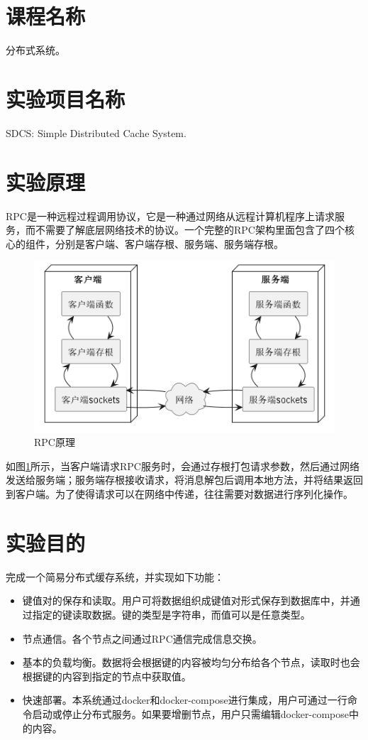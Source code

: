 \section{课程名称}

分布式系统。

\section{实验项目名称}

SDCS: Simple Distributed Cache System.

\section{实验原理}

RPC是一种远程过程调用协议，它是一种通过网络从远程计算机程序上请求服务，而不需要了解底层网络技术的协议。一个完整的RPC架构里面包含了四个核心的组件，分别是客户端、客户端存根、服务端、服务端存根。

\begin{figure}[H]
    \centering
    \includegraphics[width=\textwidth]{examples/rpc原理.png}
    \caption{RPC原理}
    \label{fig:rpc}
\end{figure}

如图\ref{fig:rpc}所示，当客户端请求RPC服务时，会通过存根打包请求参数，然后通过网络发送给服务端；服务端存根接收请求，将消息解包后调用本地方法，并将结果返回到客户端。为了使得请求可以在网络中传递，往往需要对数据进行序列化操作。

\section{实验目的}

完成一个简易分布式缓存系统，并实现如下功能：
\begin{itemize}
    \item 键值对的保存和读取。用户可将数据组织成键值对形式保存到数据库中，并通过指定的键读取数据。键的类型是字符串，而值可以是任意类型。
    \item 节点通信。各个节点之间通过RPC通信完成信息交换。
    \item 基本的负载均衡。数据将会根据键的内容被均匀分布给各个节点，读取时也会根据键的内容到指定的节点中获取值。
    \item 快速部署。本系统通过docker和docker-compose进行集成，用户可通过一行命令启动或停止分布式服务。如果要增删节点，用户只需编辑docker-compose中的内容。
\end{itemize}

